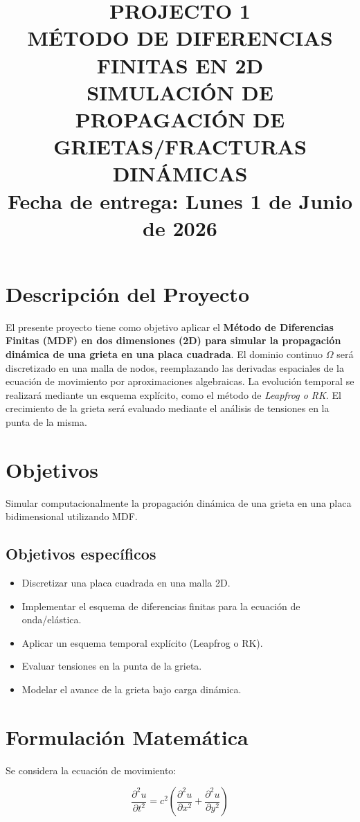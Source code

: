 \documentclass[a4paper,10pt]{exam}
\title{\textbf{PROJECTO 1\\
MÉTODO DE DIFERENCIAS FINITAS EN 2D\\
SIMULACIÓN DE PROPAGACIÓN DE GRIETAS/FRACTURAS DINÁMICAS}\\
\vspace{0.1cm}
Fecha de entrega: Lunes 1 de Junio de 2026}
\date{} %
\begin{document}
\maketitle
\vspace{-1.5cm}

\section{Descripción del Proyecto}
El presente proyecto tiene como objetivo aplicar el \textbf{Método de Diferencias Finitas (MDF) en dos dimensiones (2D) para simular la propagación dinámica de una grieta en una placa cuadrada}. El dominio continuo $\Omega$ será discretizado en una malla de nodos, reemplazando las derivadas espaciales de la ecuación de movimiento por aproximaciones algebraicas. La evolución temporal se realizará mediante un esquema explícito, como el método de \textit{Leapfrog o RK}. El crecimiento de la grieta será evaluado mediante el análisis de tensiones en la punta de la misma.

\section{Objetivos}
Simular computacionalmente la propagación dinámica de una grieta en una placa bidimensional utilizando MDF.

\subsection*{Objetivos específicos}
\begin{itemize}
\item Discretizar una placa cuadrada en una malla 2D.
\item Implementar el esquema de diferencias finitas para la ecuación de onda/elástica.
\item Aplicar un esquema temporal explícito (Leapfrog o RK).
\item Evaluar tensiones en la punta de la grieta.
\item Modelar el avance de la grieta bajo carga dinámica.
\end{itemize}

\section*{Formulación Matemática}

Se considera la ecuación de movimiento:

\[
\frac{\partial^2 u}{\partial t^2} = c^2 \left( \frac{\partial^2 u}{\partial x^2} + \frac{\partial^2 u}{\partial y^2} \right)
\]
\end{document}
